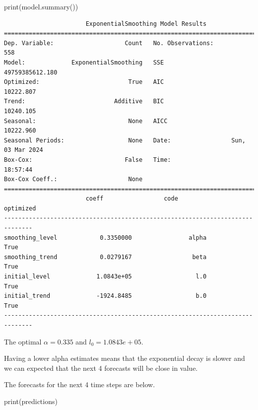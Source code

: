 \documentclass[
  11pt,
]{article}
\newenvironment{Shaded}{\begin{snugshade}}{\end{snugshade}}
\newcommand{\BuiltInTok}[1]{\textcolor[rgb]{0.00,0.23,0.31}{#1}}
\newcommand{\NormalTok}[1]{\textcolor[rgb]{0.00,0.23,0.31}{#1}}
\begin{document}
\begin{Shaded}
\begin{Highlighting}[]
\BuiltInTok{print}\NormalTok{(model.summary())}
\end{Highlighting}
\end{Shaded}

\begin{verbatim}
                       ExponentialSmoothing Model Results                       
================================================================================
Dep. Variable:                    Count   No. Observations:                  558
Model:             ExponentialSmoothing   SSE                    49759385612.180
Optimized:                         True   AIC                          10222.807
Trend:                         Additive   BIC                          10240.105
Seasonal:                          None   AICC                         10222.960
Seasonal Periods:                  None   Date:                 Sun, 03 Mar 2024
Box-Cox:                          False   Time:                         18:57:44
Box-Cox Coeff.:                    None                                         
==============================================================================
                       coeff                 code              optimized      
------------------------------------------------------------------------------
smoothing_level            0.3350000                alpha                 True
smoothing_trend            0.0279167                 beta                 True
initial_level             1.0843e+05                  l.0                 True
initial_trend             -1924.8485                  b.0                 True
------------------------------------------------------------------------------
\end{verbatim}

The optimal \(\alpha = 0.335\) and \(l_0 =  1.0843e+05\).

Having a lower alpha estimates means that the exponential decay is
slower and we can expected that the next 4 forecasts will be close in
value.

The forecasts for the next 4 time steps are below.

\begin{Shaded}
\begin{Highlighting}[]
\BuiltInTok{print}\NormalTok{(predictions)}
\end{Highlighting}
\end{Shaded}
\end{document}
